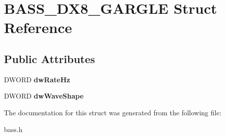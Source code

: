 \hypertarget{structBASS__DX8__GARGLE}{}\section{B\+A\+S\+S\+\_\+\+D\+X8\+\_\+\+G\+A\+R\+G\+L\+E Struct Reference}
\label{structBASS__DX8__GARGLE}
\subsection*{Public Attributes}
\begin{DoxyCompactItemize}
\item 
\hypertarget{structBASS__DX8__GARGLE_a0338a456e4a61784c095203642b3e801}{}D\+W\+O\+R\+D {\bfseries dw\+Rate\+Hz}\label{structBASS__DX8__GARGLE_a0338a456e4a61784c095203642b3e801}

\item 
\hypertarget{structBASS__DX8__GARGLE_aca685edf6d4938d62830ce4a834f0e28}{}D\+W\+O\+R\+D {\bfseries dw\+Wave\+Shape}\label{structBASS__DX8__GARGLE_aca685edf6d4938d62830ce4a834f0e28}

\end{DoxyCompactItemize}


The documentation for this struct was generated from the following file\+:\begin{DoxyCompactItemize}
\item 
bass.\+h\end{DoxyCompactItemize}
